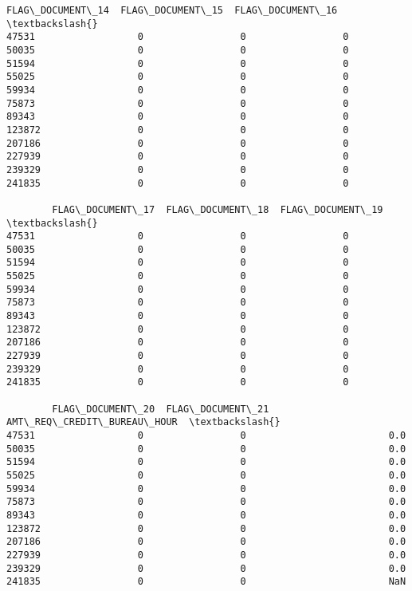 \documentclass[11pt]{article}
\begin{document}
\begin{tcolorbox}[breakable, size=fbox, boxrule=.5pt, pad at break*=1mm, opacityfill=0]
\begin{Verbatim}[commandchars=\\\{\}]
        FLAG\_DOCUMENT\_14  FLAG\_DOCUMENT\_15  FLAG\_DOCUMENT\_16  \textbackslash{}
47531                  0                 0                 0
50035                  0                 0                 0
51594                  0                 0                 0
55025                  0                 0                 0
59934                  0                 0                 0
75873                  0                 0                 0
89343                  0                 0                 0
123872                 0                 0                 0
207186                 0                 0                 0
227939                 0                 0                 0
239329                 0                 0                 0
241835                 0                 0                 0

        FLAG\_DOCUMENT\_17  FLAG\_DOCUMENT\_18  FLAG\_DOCUMENT\_19  \textbackslash{}
47531                  0                 0                 0
50035                  0                 0                 0
51594                  0                 0                 0
55025                  0                 0                 0
59934                  0                 0                 0
75873                  0                 0                 0
89343                  0                 0                 0
123872                 0                 0                 0
207186                 0                 0                 0
227939                 0                 0                 0
239329                 0                 0                 0
241835                 0                 0                 0

        FLAG\_DOCUMENT\_20  FLAG\_DOCUMENT\_21  AMT\_REQ\_CREDIT\_BUREAU\_HOUR  \textbackslash{}
47531                  0                 0                         0.0
50035                  0                 0                         0.0
51594                  0                 0                         0.0
55025                  0                 0                         0.0
59934                  0                 0                         0.0
75873                  0                 0                         0.0
89343                  0                 0                         0.0
123872                 0                 0                         0.0
207186                 0                 0                         0.0
227939                 0                 0                         0.0
239329                 0                 0                         0.0
241835                 0                 0                         NaN


\end{Verbatim}
\end{tcolorbox}
\end{document}
